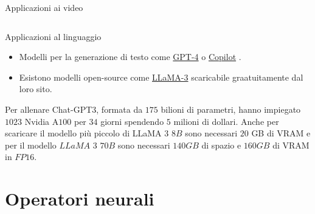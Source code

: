 \documentclass[aspectratio=169]{beamer}
\begin{document}
\begin{frame}{Applicazioni ai video}
\begin{columns}[T]
\begin{column}{.33\textwidth}
\begin{center}
            \end{center}
        \end{column}
    \end{columns}
\end{frame}

\begin{frame}{Applicazioni al linguaggio}
    \begin{itemize}
    \item Modelli per la generazione di testo come \href{https://openai.com/index/gpt-4/}{GPT-4}  o \href{https://github.com/features/copilot}{Copilot} .
    \item Esistono modelli open-source come \href{https://llama.meta.com/}{LLaMA-3}  scaricabile graatuitamente dal loro sito. 
    \end{itemize}
    \pause
    Per allenare Chat-GPT3, formata da $175$ bilioni di parametri, hanno impiegato $1023$ Nvidia A$100$ per $34$ giorni spendendo $5$ milioni di dollari.
    \pause
    Anche per scaricare il modello più piccolo di LLaMA $3$ $8B$ sono necessari $20$ GB di VRAM e per il modello $LLaMA$ $3$ $70B$ sono necessari $140GB$ di spazio e $160GB$ di VRAM in $FP16$.
\end{frame}

\section{Operatori neurali}
\sectionpage
\end{document}

